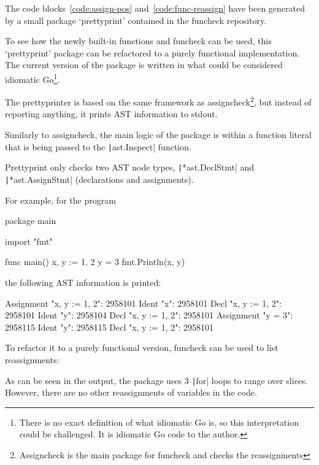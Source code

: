 The code blocks~\ref{code:assign-pos} and~\ref{code:func-reassign} have been
generated by a small package `prettyprint' contained in the funcheck repository.

To see how the newly built-in functions and funcheck can be used, this `prettyprint' package
can be refactored to a purely functional implementation.
The current version of the package is written in what could be considered idiomatic
Go\footnote{
	There is no exact definition of what idiomatic Go is, so this interpretation
	could be challenged. It is idiomatic Go code to the author.
}.


The prettyprinter is based on the same framework as assigncheck\footnote{Assigncheck
is the main package for funcheck and checks the reassignments}, but instead
of reporting anything, it prints AST information to \gls{stdout}.

Similarly to assigncheck, the main logic of the package is within a
function literal that is being passed to the \texttt|ast.Inspect|
function.

Prettyprint only checks two AST node types, \texttt|*ast.DeclStmt|
and \texttt|*ast.AssignStmt| (declarations and assignments).

For example, for the program
\begin{gocode}
package main

import "fmt"

func main() {
	x, y := 1, 2
	y = 3
	fmt.Println(x, y)
}
\end{gocode}
the following AST information is printed:

\begin{gocode}
Assignment "x, y := 1, 2": 2958101
		Ident "x": 2958101
				Decl "x, y := 1, 2": 2958101
		Ident "y": 2958104
				Decl "x, y := 1, 2": 2958101
Assignment "y = 3": 2958115
		Ident "y": 2958115
				Decl "x, y := 1, 2": 2958101
\end{gocode}

To refactor it to a purely functional version, funcheck can be used to
list reassignments:

As can be seen in the output, the package uses 3 \texttt|for| loops to range over
slices. However, there are no other reassignments of variables in the code.

